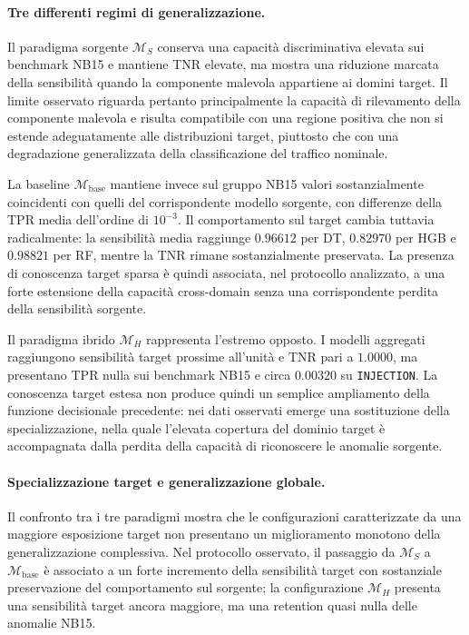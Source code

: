 \paragraph{Tre differenti regimi di generalizzazione.}
Il paradigma sorgente $\mathcal{M}_{S}$ conserva una capacità discriminativa elevata sui benchmark NB15 e mantiene TNR elevate, ma mostra una riduzione marcata della sensibilità quando la componente malevola appartiene ai domini target. 
Il limite osservato riguarda pertanto principalmente la capacità di rilevamento della componente malevola e risulta compatibile con una regione positiva che non si estende adeguatamente alle distribuzioni target, piuttosto che con una degradazione generalizzata della classificazione del traffico nominale.

La baseline $\mathcal{M}_{\mathrm{base}}$ mantiene invece sul gruppo NB15 valori sostanzialmente coincidenti con quelli del corrispondente modello sorgente, con differenze della TPR media dell'ordine di $10^{-3}$. 
Il comportamento sul target cambia tuttavia radicalmente: la sensibilità media raggiunge $0.96612$ per DT, $0.82970$ per HGB e $0.98821$ per RF, mentre la TNR rimane sostanzialmente preservata. 
La presenza di conoscenza target sparsa è quindi associata, nel protocollo analizzato, a una forte estensione della capacità cross-domain senza una corrispondente perdita della sensibilità sorgente.

Il paradigma ibrido $\mathcal{M}_{H}$ rappresenta l'estremo opposto. 
I modelli aggregati raggiungono sensibilità target prossime all'unità e TNR pari a $1.0000$, ma presentano TPR nulla sui benchmark NB15 e circa $0.00320$ su \texttt{INJECTION}. 
La conoscenza target estesa non produce quindi un semplice ampliamento della funzione decisionale precedente: nei dati osservati emerge una sostituzione della specializzazione, nella quale l'elevata copertura del dominio target è accompagnata dalla perdita della capacità di riconoscere le anomalie sorgente.

\paragraph{Specializzazione target e generalizzazione globale.}
Il confronto tra i tre paradigmi mostra che le configurazioni caratterizzate da una maggiore esposizione target non presentano un miglioramento monotono della generalizzazione complessiva. 
Nel protocollo osservato, il passaggio da $\mathcal{M}_{S}$ a $\mathcal{M}_{\mathrm{base}}$ è associato a un forte incremento della sensibilità target con sostanziale preservazione del comportamento sul sorgente; la configurazione $\mathcal{M}_{H}$ presenta una sensibilità target ancora maggiore, ma una retention quasi nulla delle anomalie NB15.

